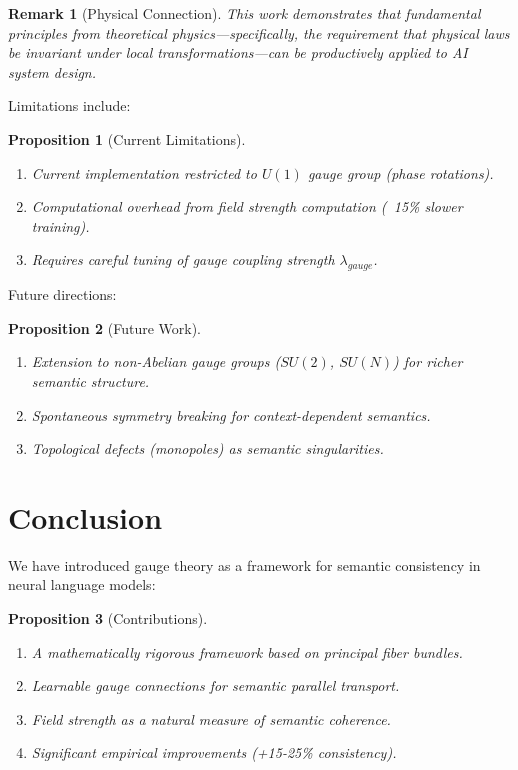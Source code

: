 \documentclass[12pt,letterpaper,twoside]{article}
\newtheorem{remarque}{Remark}[section]
\newtheorem{prop}{Proposition}[section]
\begin{document}
\begin{remarque}[Physical Connection]
This work demonstrates that fundamental principles from theoretical physics---specifically, the requirement that physical laws be invariant under local transformations---can be productively applied to AI system design.
\end{remarque}

Limitations include:

\begin{prop}[Current Limitations]
\begin{enumerate}
\item Current implementation restricted to $U(1)$ gauge group (phase rotations).
\item Computational overhead from field strength computation (~15\% slower training).
\item Requires careful tuning of gauge coupling strength $\lambda_{gauge}$.
\end{enumerate}
\end{prop}

Future directions:

\begin{prop}[Future Work]
\begin{enumerate}
\item Extension to non-Abelian gauge groups ($SU(2)$, $SU(N)$) for richer semantic structure.
\item Spontaneous symmetry breaking for context-dependent semantics.
\item Topological defects (monopoles) as semantic singularities.
\end{enumerate}
\end{prop}

\section{Conclusion}

We have introduced gauge theory as a framework for semantic consistency in neural language models:

\begin{prop}[Contributions]
\begin{enumerate}
\item A mathematically rigorous framework based on principal fiber bundles.
\item Learnable gauge connections for semantic parallel transport.
\item Field strength as a natural measure of semantic coherence.
\item Significant empirical improvements (+15-25\% consistency).
\end{enumerate}
\end{prop}
\end{document}

